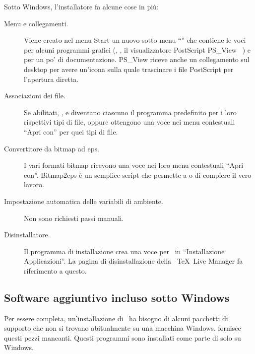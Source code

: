 \documentclass{article}
\begin{document}
Sotto Windows, l'installatore fa alcune cose in più:
\begin{description}
\item[Menu e collegamenti.] Viene creato nel menu Start un nuovo sotto
  menu ``\TL'' che contiene le voci per alcuni programmi grafici
  (, , il visualizzatore PostScript PS\_View
  \Dash\ ) e per un po' di documentazione. PS\_View riceve anche
  un collegamento sul desktop per avere un'icona sulla quale trascinare i
  file PostScript per l'apertura diretta.
\item[Associazioni dei file.] Se abilitati, ,  e
   diventano ciascuno il programma predefinito per i loro
  rispettivi tipi di file, oppure ottengono una voce nei menu contestuali
  ``Apri con'' per quei tipi di file.
\item[Convertitore da bitmap ad eps.] I vari formati bitmap ricevono una
  voce  nei loro menu contestuali ``Apri con''.
  Bitmap2eps è un semplice script che permette a  o
   di compiere il vero lavoro.
\item[Impostazione automatica delle variabili di ambiente.] Non sono
  richiesti passi manuali.
\item[Disinstallatore.] Il programma di installazione crea una voce per
  \TL\ in ``Installazione Applicazioni''. La pagina di disinstallazione
  della \GUI\ \TeX\ Live Manager fa riferimento a questo.
\end{description}

\subsection{Software aggiuntivo incluso sotto Windows}

Per essere completa, un'installazione di \TL\ ha bisogno di alcuni
pacchetti di supporto che non si trovano abitualmente su una macchina
Windows. \TL{} fornisce questi pezzi mancanti. Questi programmi sono
installati come parte di \TL{} solo su Windows.
\end{document}
